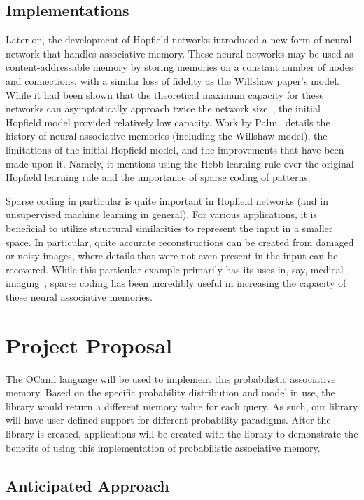 \documentclass{sig-alternate}
\begin{document}
\subsection{Implementations}
\label{subsec:implementations}
Later on, the development of Hopfield networks introduced a new form of neural network
that handles associative memory. These neural networks may be used as content-addressable memory by
storing memories on a constant number of nodes and connections, with a similar loss of 
fidelity as the Willshaw paper's model. While it had been shown that the theoretical maximum capacity for these networks
can asymptotically approach twice the network size~\cite{gardner}, the initial Hopfield model 
provided relatively low capacity. Work by Palm~\cite{palm} details the history of 
neural associative memories (including the Willshaw model), the limitations of the initial Hopfield model, and the improvements
that have been made upon it. Namely, it mentions using the Hebb learning rule over the original
Hopfield learning rule and the importance of sparse coding of patterns. 

Sparse coding in particular is quite important in Hopfield networks (and in unsupervised
machine learning in general). For various applications, it is beneficial to utilize
structural similarities to represent the input in a smaller space. In particular, quite 
accurate reconstructions can be created from damaged or noisy images, where details that were 
not even present in the input can be recovered. While this particular example primarily has its uses in, say, 
medical imaging~\cite{yang}, sparse coding has been incredibly useful in increasing the
capacity of these neural associative memories. 


\section{Project Proposal}
\label{sec:project_proposal}
The OCaml language will be used to implement this probabilistic associative memory. 
Based on the specific probability distribution and model in use, the library would return 
a different memory value for each query.
As such, our library will have user-defined support for different probability paradigms. 
After the library is created, applications will be created with the library to demonstrate the benefits of using this implementation
of probabilistic associative memory.

\subsection{Anticipated Approach}
\label{subsec:approach}
\end{document}
